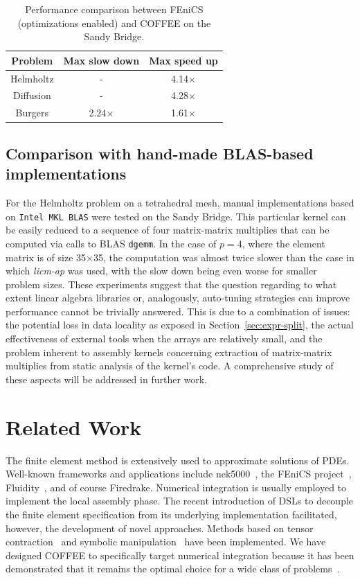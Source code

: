 \documentclass[conference]{IEEEtran}
\begin{document}
\begin{table}[h]
\begin{center}
\begin{tabulary}{1.0\columnwidth}{C|C|C}
\hline
Problem & Max slow down & Max speed up \\\hline
Helmholtz & - & 4.14$\times$ \\
Diffusion & - & 4.28$\times$ \\
Burgers & 2.24$\times$ & 1.61$\times$ \\\hline
\end{tabulary}
\end{center}
\caption{Performance comparison between FEniCS (optimizations enabled) and COFFEE on the Sandy Bridge.}
\label{table:comparison-to-FFC-opt}
\end{table}

\subsection{Comparison with hand-made BLAS-based implementations}
\label{sec:perf-eval-blas}
For the Helmholtz problem on a tetrahedral mesh, manual implementations based on \texttt{Intel MKL BLAS} were tested on the Sandy Bridge. This particular kernel can be easily reduced to a sequence of four matrix-matrix multiplies that can be computed via calls to BLAS \texttt{dgemm}. In the case of $p=4$, where the element matrix is of size 35$\times$35, the computation was almost twice slower than the case in which \emph{licm-ap} was used, with the slow down being even worse for smaller problem sizes. These experiments suggest that the question regarding to what extent linear algebra libraries or, analogously, auto-tuning strategies can improve performance cannot be trivially answered. This is due to a combination of issues: the potential loss in data locality as exposed in Section~\ref{sec:expr-split}, the actual effectiveness of external tools when the arrays are relatively small, and the problem inherent to assembly kernels concerning extraction of matrix-matrix multiplies from static analysis of the kernel's code. A comprehensive study of these aspects will be addressed in further work. 


\section{Related Work}
\label{sec:related-work}
The finite element method is extensively used to approximate solutions of PDEs. Well-known frameworks and applications include nek5000~\cite{nek5000-web-page}, the FEniCS project~\cite{Fenics}, Fluidity~\cite{fluidity_manual_v4}, and of course Firedrake. Numerical integration is usually employed to implement the local assembly phase. The recent introduction of DSLs to decouple the finite element specification from its underlying implementation facilitated, however, the development of novel approaches. Methods based on tensor contraction~\cite{FFC-Compiler} and symbolic manipulation~\cite{Francis} have been implemented. We have designed COFFEE to specifically target numerical integration because it has been demonstrated that it remains the optimal choice for a wide class of problems~\cite{quadrature1}.
\end{document}
